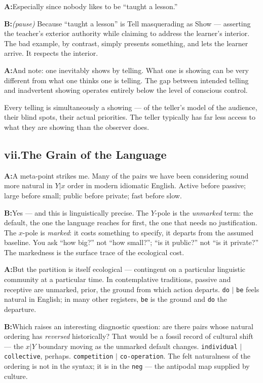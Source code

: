 \documentclass[11pt]{article}
\newcommand{\A}{\medskip\noindent\textbf{A:}\quad}
\newcommand{\B}{\medskip\noindent\textbf{B:}\quad}
\begin{document}
\A Especially since nobody likes to be ``taught a lesson.''

\B \textit{(pause)} Because ``taught a lesson'' is Tell masquerading
as Show --- asserting the teacher's exterior authority while claiming
to address the learner's interior. The bad example, by contrast,
simply presents something, and lets the learner arrive. It respects
the interior.

\A And note: one inevitably shows by telling. What one is showing can
be very different from what one thinks one is telling. The gap between
intended telling and inadvertent showing operates entirely below the
level of conscious control.

\begin{pearl}
Every telling is simultaneously a showing --- of the teller's model
of the audience, their blind spots, their actual priorities. The
teller typically has far less access to what they are showing than
the observer does.
\end{pearl}

\bigskip
\subsection*{vii.\enspace The Grain of the Language}

\A A meta-point strikes me. Many of the pairs we have been
considering sound more natural in $Y|x$ order in modern idiomatic
English. Active before passive; large before small; public before
private; fast before slow.

\B Yes --- and this is linguistically precise. The $Y$-pole is the
\emph{unmarked} term: the default, the one the language reaches for
first, the one that needs no justification. The $x$-pole is
\emph{marked}: it costs something to specify, it departs from the
assumed baseline. You ask ``how big?'' not ``how small?''; ``is it
public?'' not ``is it private?'' The markedness is the surface trace
of the ecological cost.

\A But the partition is itself ecological --- contingent on a
particular linguistic community at a particular time. In
contemplative traditions, passive and receptive are unmarked,
prior, the ground from which action departs. \texttt{do} $|$
\texttt{be} feels natural in English; in many other registers,
\texttt{be} is the ground and \texttt{do} the departure.

\B Which raises an interesting diagnostic question: are there pairs
whose natural ordering has \emph{reversed} historically? That would
be a fossil record of cultural shift --- the $x|Y$ boundary moving
as the unmarked default changes. \texttt{individual} $|$
\texttt{collective}, perhaps. \texttt{competition} $|$
\texttt{co-operation}. The felt naturalness of the ordering is not
in the syntax; it is in the \texttt{neg} --- the antipodal map
supplied by culture.
\end{document}
